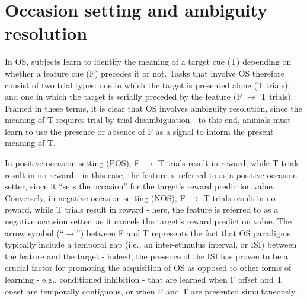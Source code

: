 \documentclass[11pt]{article}
\let\cite=\citep
\begin{document}
\section*{Occasion setting and ambiguity resolution}

In OS, subjects learn to identify the meaning of a target cue (T) depending on 
whether a feature cue (F) precedes it or not. Tasks that involve OS therefore 
consist of two trial types: one in which the target is presented alone (T 
trials), and one in which the target is serially preceded by the feature (F $
\rightarrow$ T trials). Framed in these terms, it is clear that OS involves 
ambiguity resolution, since the meaning of T requires trial-by-trial 
disambiguation - to this end, animals must learn to use the presence or absence 
of F as a signal to inform the present meaning of T.

In positive occasion setting (POS), F $\rightarrow$ T trials result in reward, 
while T trials result in no reward - in this case, the feature is referred to 
as a positive occasion setter, since it ``sets the occasion'' for the target's 
reward prediction value. Conversely, in negative occasion setting (NOS), F $
\rightarrow$ T trials result in no reward, while T trials result in reward - 
here, the feature is referred to as a negative occasion setter, as it cancels 
the target's reward prediction value. The arrow symbol (``$\rightarrow$'') 
between F and T represents the fact that OS paradigms typically include a 
temporal gap (i.e., an inter-stimulus interval, or ISI) between the feature and 
the target - indeed, the presence of the ISI has proven to be a crucial factor 
for promoting the acquisition of OS as opposed to other forms of learning - 
e.g., conditioned inhibition \cite{Rescorla1969} - that are learned when F 
offset and T onset are temporally contiguous, or when F and T are presented 
simultaneously \cite{Holland1992}. 
\end{document}
